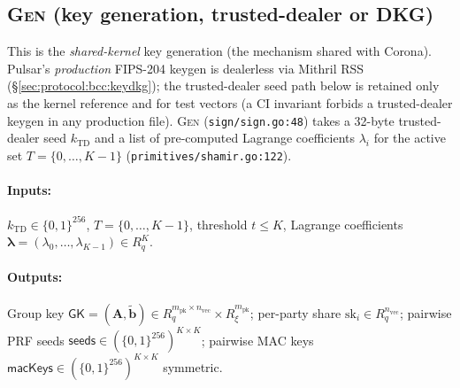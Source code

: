 \subsection{\textsc{Gen} (key generation, trusted-dealer or DKG)}
\label{sec:protocol:gen}

This is the \emph{shared-kernel} key generation (the mechanism shared with
Corona). Pulsar's \emph{production} FIPS-204 keygen is dealerless via
Mithril RSS (\S\ref{sec:protocol:bcc:keydkg}); the trusted-dealer seed
path below is retained only as the kernel reference and for test vectors
(a CI invariant forbids a trusted-dealer keygen in any production file).
\textsc{Gen} (\texttt{sign/sign.go:48}) takes a 32-byte trusted-dealer
seed $k_{\mathrm{TD}}$ and a list of pre-computed Lagrange coefficients
$\lambda_i$ for the active set $T = \{0, \ldots, K-1\}$
(\texttt{primitives/shamir.go:122}).

\paragraph{Inputs:} $k_{\mathrm{TD}} \in \{0,1\}^{256}$,
$T = \{0, \ldots, K-1\}$, threshold $t \leq K$, Lagrange coefficients
$\boldsymbol\lambda = (\lambda_0, \ldots, \lambda_{K-1}) \in R_q^K$.

\paragraph{Outputs:} Group key
$\mathsf{GK} = (\mathbf{A}, \tilde{\mathbf{b}}) \in
R_q^{m_{\mathrm{pk}} \times n_{\mathrm{vec}}} \times
R_\xi^{m_{\mathrm{pk}}}$; per-party share $\mathrm{sk}_i \in
R_q^{n_{\mathrm{vec}}}$; pairwise PRF seeds
$\mathsf{seeds} \in (\{0,1\}^{256})^{K \times K}$; pairwise MAC keys
$\mathsf{macKeys} \in (\{0,1\}^{256})^{K \times K}$ symmetric.

